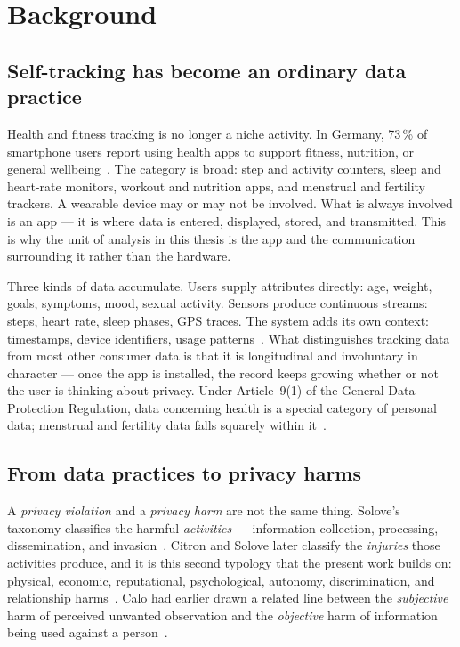 \section{Background}
\label{sec:background}

\subsection{Self-tracking has become an ordinary data practice}

Health and fitness tracking is no longer a niche activity. In Germany,
73\,\% of smartphone users report using health apps to support fitness,
nutrition, or general wellbeing~\parencite{bitkom2025health}. The category is
broad: step and activity counters, sleep and heart-rate monitors, workout and
nutrition apps, and menstrual and fertility trackers. A wearable device may or
may not be involved. What is always involved is an app --- it is where data is
entered, displayed, stored, and transmitted. This is why the unit of analysis
in this thesis is the app and the communication surrounding it rather than the
hardware.

Three kinds of data accumulate. Users supply attributes directly: age, weight,
goals, symptoms, mood, sexual activity. Sensors produce continuous streams:
steps, heart rate, sleep phases, GPS traces. The system adds its own context:
timestamps, device identifiers, usage patterns~\parencite{gabriele2020understanding}.
What distinguishes tracking data from most other consumer data is that it is
longitudinal and involuntary in character --- once the app is installed, the
record keeps growing whether or not the user is thinking about privacy. Under
Article~9(1) of the General Data Protection Regulation, data concerning health
is a special category of personal data; menstrual and fertility data falls
squarely within it~\parencite{gdpr2016}.

\subsection{From data practices to privacy harms}

A \emph{privacy violation} and a \emph{privacy harm} are not the same thing.
Solove's taxonomy classifies the harmful \emph{activities} --- information
collection, processing, dissemination, and
invasion~\parencite{solove2006taxonomy}. Citron and Solove later classify the
\emph{injuries} those activities produce, and it is this second typology that
the present work builds on: physical, economic, reputational, psychological,
autonomy, discrimination, and relationship
harms~\parencite[830--861]{citron2021harms}. Calo had earlier drawn a related
line between the \emph{subjective} harm of perceived unwanted observation and
the \emph{objective} harm of information being used against a
person~\parencite{calo2011boundaries}.


